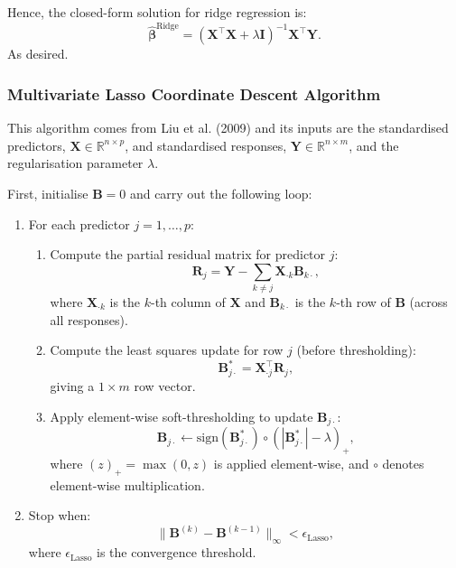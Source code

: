 \documentclass[11pt]{report} %
\begin{document}
\noindent Hence, the closed-form solution for ridge regression is:
\begin{equation*}
\hat{\boldsymbol{\beta}}^{\text{Ridge}} = (\mathbf{X}^\top \mathbf{X} + \lambda \mathbf{I})^{-1} \mathbf{X}^\top \mathbf{Y}.
\end{equation*}
\noindent As desired.

\subsubsection{Multivariate Lasso Coordinate Descent Algorithm}
\label{multi-coord}

This algorithm comes from Liu et al. (2009) and its inputs are the standardised predictors, $\mathbf{X} \in \mathbb{R}^{n \times p}$, and standardised responses, $\mathbf{Y} \in \mathbb{R}^{n \times m}$, and the regularisation parameter $\lambda$.

\noindent First, initialise $\mathbf{B} = 0$ and carry out the following loop:

\begin{enumerate}
    \item For each predictor $j = 1, \dots, p$:
    \begin{enumerate}
        \item Compute the partial residual matrix for predictor $j$:
        \[
        \mathbf{R}_j = \mathbf{Y} - \sum_{k \neq j} \mathbf{X}_{\cdot k} \mathbf{B}_{k\cdot},
        \]
        where $\mathbf{X}_{\cdot k}$ is the $k$-th column of $\mathbf{X}$ and $\mathbf{B}_{k\cdot}$ is the $k$-th row of $\mathbf{B}$ (across all responses).
        
        \item Compute the least squares update for row $j$ (before thresholding):
        \[
        \mathbf{B}_{j\cdot}^* = \mathbf{X}_{\cdot j}^\top \mathbf{R}_j,
        \]
        giving a $1 \times m$ row vector.
        
        \item Apply element-wise soft-thresholding to update $\mathbf{B}_{j\cdot}$:
        \[
        \mathbf{B}_{j\cdot} \leftarrow \text{sign}(\mathbf{B}_{j\cdot}^*) \circ \left( |\mathbf{B}_{j\cdot}^*| - \lambda \right)_+,
        \]
        where $(z)_+ = \max(0, z)$ is applied element-wise, and $\circ$ denotes element-wise multiplication.
    \end{enumerate}
    \item Stop when:
    \[
    \|\mathbf{B}^{(k)} - \mathbf{B}^{(k-1)}\|_{\infty} < \epsilon_\text{Lasso},
    \]
    where $\epsilon_\text{Lasso}$ is the convergence threshold.\cite{liu2009blockwise}
\end{enumerate}
\end{document}
